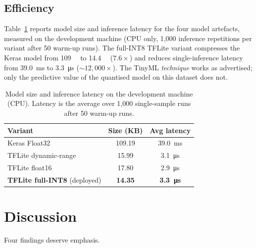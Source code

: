 \documentclass[conference]{IEEEtran}
\begin{document}
\subsection{Efficiency}
Table~\ref{tab:efficiency} reports model size and inference latency for
the four model artefacts, measured on the development machine
(CPU only, 1{,}000 inference repetitions per variant after 50 warm-up
runs). The full-INT8 TFLite variant compresses the Keras model from
\SI{109}{\kilo\byte} to \SI{14.4}{\kilo\byte} ($7.6\times$) and reduces
single-inference latency from \SI{39.0}{\milli\second} to
\SI{3.3}{\micro\second} ($\sim\!12{,}000\times$). The TinyML
\emph{technique} works as advertised; only the predictive value of the
quantised model on this dataset does not.

\begin{table}[t]
\caption{Model size and inference latency on the development machine
(CPU). Latency is the average over 1{,}000 single-sample runs after 50
warm-up runs.}
\label{tab:efficiency}
\centering
\small
\begin{tabular}{lcc}
\toprule
Variant                  & Size (KB) & Avg latency \\
\midrule
Keras Float32            & 109.19    & \SI{39.0}{\milli\second} \\
TFLite dynamic-range     & \phantom{0}15.99 & \SI{3.1}{\micro\second} \\
TFLite float16           & \phantom{0}17.80 & \SI{2.9}{\micro\second} \\
\textbf{TFLite full-INT8} (deployed) & \textbf{\phantom{0}14.35} & \textbf{\SI{3.3}{\micro\second}} \\
\bottomrule
\end{tabular}
\end{table}

\section{Discussion}
Four findings deserve emphasis.
\end{document}
